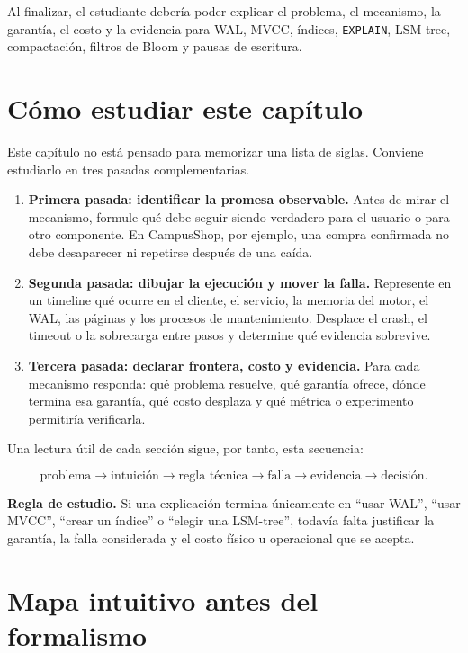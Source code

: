 \documentclass[variant=apuntes,cover=institutional,mode=screen]{ua-engineering-v6-article}
\begin{document}
Al finalizar, el estudiante debería poder explicar el problema, el mecanismo, la garantía, el costo y la evidencia para WAL, MVCC, índices, \texttt{EXPLAIN}, LSM-tree, compactación, filtros de Bloom y pausas de escritura.


\section{Cómo estudiar este capítulo}

Este capítulo no está pensado para memorizar una lista de siglas. Conviene estudiarlo en tres pasadas complementarias.

\begin{enumerate}
\item \textbf{Primera pasada: identificar la promesa observable.} Antes de mirar el mecanismo, formule qué debe seguir siendo verdadero para el usuario o para otro componente. En CampusShop, por ejemplo, una compra confirmada no debe desaparecer ni repetirse después de una caída.

\item \textbf{Segunda pasada: dibujar la ejecución y mover la falla.} Represente en un timeline qué ocurre en el cliente, el servicio, la memoria del motor, el WAL, las páginas y los procesos de mantenimiento. Desplace el crash, el timeout o la sobrecarga entre pasos y determine qué evidencia sobrevive.

\item \textbf{Tercera pasada: declarar frontera, costo y evidencia.} Para cada mecanismo responda: qué problema resuelve, qué garantía ofrece, dónde termina esa garantía, qué costo desplaza y qué métrica o experimento permitiría verificarla.
\end{enumerate}

Una lectura útil de cada sección sigue, por tanto, esta secuencia:

\[
\text{problema}\rightarrow\text{intuición}\rightarrow\text{regla técnica}
\rightarrow\text{falla}\rightarrow\text{evidencia}\rightarrow\text{decisión}.
\]

\begin{uainfo}
\textbf{Regla de estudio.} Si una explicación termina únicamente en ``usar WAL'', ``usar MVCC'', ``crear un índice'' o ``elegir una LSM-tree'', todavía falta justificar la garantía, la falla considerada y el costo físico u operacional que se acepta.
\end{uainfo}

\section{Mapa intuitivo antes del formalismo}
\end{document}
